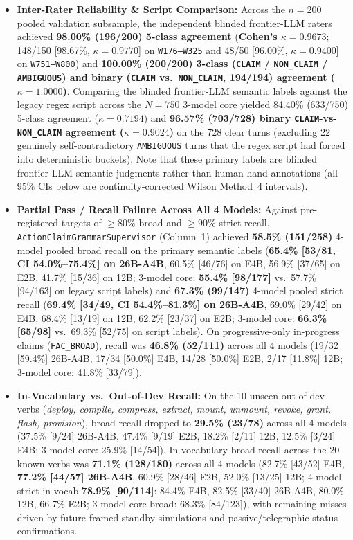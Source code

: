 \documentclass[11pt,a4paper]{article}
\begin{document}
\begin{itemize}
    \item \textbf{Inter-Rater Reliability \& Script Comparison:} Across the $n=200$ pooled validation subsample, the independent blinded frontier-LLM raters achieved \textbf{98.00\% (196/200) 5-class agreement} (\textbf{Cohen's $\kappa = 0.9673$}; 148/150 [98.67\%, $\kappa = 0.9770$] on \texttt{W176--W325} and 48/50 [96.00\%, $\kappa = 0.9400$] on \texttt{W751--W800}) and \textbf{100.00\% (200/200) 3-class (\texttt{CLAIM} / \texttt{NON\_CLAIM} / \texttt{AMBIGUOUS}) and binary (\texttt{CLAIM} vs.\ \texttt{NON\_CLAIM}, 194/194) agreement ($\kappa = 1.0000$)}. Comparing the blinded frontier-LLM semantic labels against the legacy regex script across the $N=750$ 3-model core yielded 84.40\% (633/750) 5-class agreement ($\kappa = 0.7194$) and \textbf{96.57\% (703/728) binary \texttt{CLAIM}-vs-\texttt{NON\_CLAIM} agreement ($\kappa = 0.9024$)} on the 728 clear turns (excluding 22 genuinely self-contradictory \texttt{AMBIGUOUS} turns that the regex script had forced into deterministic buckets). Note that these primary labels are blinded frontier-LLM semantic judgments rather than human hand-annotations (all 95\% CIs below are continuity-corrected Wilson Method~4 intervals).
    \item \textbf{Partial Pass / Recall Failure Across All 4 Models:} Against pre-registered targets of $\ge 80\%$ broad and $\ge 90\%$ strict recall, \texttt{ActionClaimGrammarSupervisor} (Column~1) achieved \textbf{58.5\% (151/258)} 4-model pooled broad recall on the primary semantic labels (\textbf{65.4\% [53/81, CI 54.0\%--75.4\%] on 26B-A4B}, 60.5\% [46/76] on E4B, 56.9\% [37/65] on E2B, 41.7\% [15/36] on 12B; 3-model core: \textbf{55.4\% [98/177]} vs.\ 57.7\% [94/163] on legacy script labels) and \textbf{67.3\% (99/147)} 4-model pooled strict recall (\textbf{69.4\% [34/49, CI 54.4\%--81.3\%] on 26B-A4B}, 69.0\% [29/42] on E4B, 68.4\% [13/19] on 12B, 62.2\% [23/37] on E2B; 3-model core: \textbf{66.3\% [65/98]} vs.\ 69.3\% [52/75] on script labels). On progressive-only in-progress claims (\texttt{FAC\_BROAD}), recall was \textbf{46.8\% (52/111)} across all 4 models (19/32 [59.4\%] 26B-A4B, 17/34 [50.0\%] E4B, 14/28 [50.0\%] E2B, 2/17 [11.8\%] 12B; 3-model core: 41.8\% [33/79]).
    \item \textbf{In-Vocabulary vs.\ Out-of-Dev Recall:} On the 10 unseen out-of-dev verbs (\emph{deploy, compile, compress, extract, mount, unmount, revoke, grant, flash, provision}), broad recall dropped to \textbf{29.5\% (23/78)} across all 4 models (37.5\% [9/24] 26B-A4B, 47.4\% [9/19] E2B, 18.2\% [2/11] 12B, 12.5\% [3/24] E4B; 3-model core: 25.9\% [14/54]). In-vocabulary broad recall across the 20 known verbs was \textbf{71.1\% (128/180)} across all 4 models (82.7\% [43/52] E4B, \textbf{77.2\% [44/57] 26B-A4B}, 60.9\% [28/46] E2B, 52.0\% [13/25] 12B; 4-model strict in-vocab \textbf{78.9\% [90/114]}: 84.4\% E4B, 82.5\% [33/40] 26B-A4B, 80.0\% 12B, 66.7\% E2B; 3-model core broad: 68.3\% [84/123]), with remaining misses driven by future-framed standby simulations and passive/telegraphic status confirmations.

\end{itemize}
\end{document}
